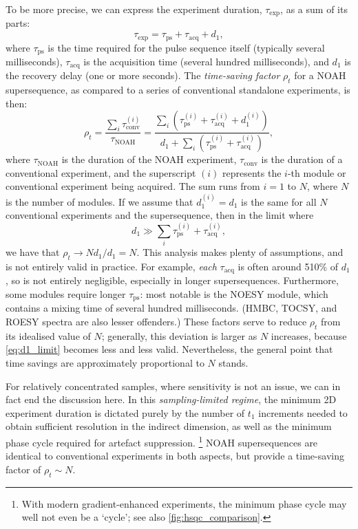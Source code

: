 To be more precise, we can express the experiment duration, $\tau_\text{exp}$, as a sum of its parts:
\begin{equation}
    \label{eq:exp_duration_2d}
    \tau_\text{exp} = \tau_\text{ps} + \tau_\text{acq} + d_1,
\end{equation}
where $\tau_\text{ps}$ is the time required for the pulse sequence itself (typically several milliseconds), $\tau_\text{acq}$ is the acquisition time (several hundred milliseconds), and $d_1$ is the recovery delay (one or more seconds).
The \textit{time-saving factor} $\rho_t$ for a NOAH supersequence, as compared to a series of conventional standalone experiments, is then:
\begin{equation}
    \label{eq:rho_t}
    \rho_t
    = \frac{\sum_i \tau_\text{conv}^{(i)}}{\tau_\text{NOAH}}
    = \frac{{\sum_i (\tau_\text{ps}^{(i)} + \tau_\text{acq}^{(i)} + d_1^{(i)})}}{d_1 + \sum_i (\tau_\text{ps}^{(i)} + \tau_\text{acq}^{(i)})},
\end{equation}
where $\tau_\text{NOAH}$ is the duration of the NOAH experiment, $\tau_\text{conv}$ is the duration of a conventional experiment, and the superscript $(i)$ represents the $i$-th module or conventional experiment being acquired.
The sum runs from $i = 1$ to $N$, where $N$ is the number of modules.
If we assume that $d_1^{(i)} = d_1$ is the same for all $N$ conventional experiments and the supersequence, then in the limit where
\begin{equation}
    \label{eq:d1_limit}
    d_1 \gg \sum_i \tau_\text{ps}^{(i)} + \tau_\text{acq}^{(i)},
\end{equation}
we have that $\rho_t \to Nd_1/d_1 = N$.
This analysis makes plenty of assumptions, and is not entirely valid in practice.
For example, \textit{each} $\tau_\text{acq}$ is often around 5\text{--}10\% of $d_1$, so is not entirely negligible, especially in longer supersequences.
Furthermore, some modules require longer $\tau_\text{ps}$: most notable is the NOESY module, which contains a mixing time of several hundred milliseconds. (HMBC, TOCSY, and ROESY spectra are also lesser offenders.)
These factors serve to reduce $\rho_t$ from its idealised value of $N$; generally, this deviation is larger as $N$ increases, because \cref{eq:d1_limit} becomes less and less valid.
Nevertheless, the general point that time savings are approximately proportional to $N$ stands.

For relatively concentrated samples, where sensitivity is not an issue, we can in fact end the discussion here.
In this \textit{sampling-limited regime}, the minimum 2D experiment duration is dictated purely by the number of $t_1$ increments needed to obtain sufficient resolution in the indirect dimension, as well as the minimum phase cycle required for artefact suppression.%
\footnote{With modern gradient-enhanced experiments, the minimum phase cycle may well not even be a `cycle'; see also \cref{fig:hsqc_comparison}.}
NOAH supersequences are identical to conventional experiments in both aspects, but provide a time-saving factor of $\rho_t \sim N$.

